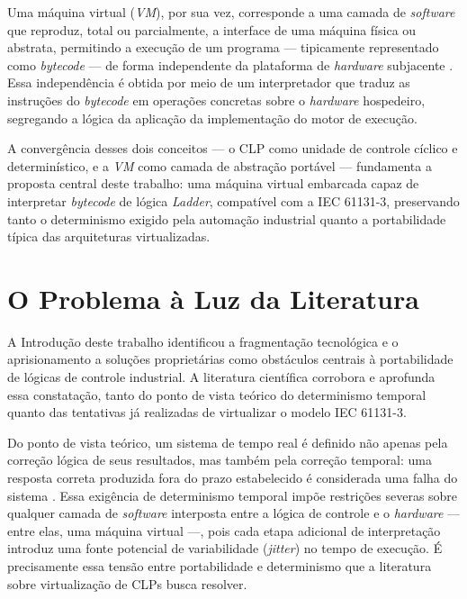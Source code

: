 Uma máquina virtual (\textit{VM}), por sua vez, corresponde a uma camada de \textit{software} que reproduz, total ou parcialmente, a interface de uma máquina física ou abstrata, permitindo a execução de um programa --- tipicamente representado como \textit{bytecode} --- de forma independente da plataforma de \textit{hardware} subjacente \cite{smith:2005}.
Essa independência é obtida por meio de um interpretador que traduz as instruções do \textit{bytecode} em operações concretas sobre o \textit{hardware} hospedeiro, segregando a lógica da aplicação da implementação do motor de execução.

A convergência desses dois conceitos --- o CLP como unidade de controle cíclico e determinístico, e a \textit{VM} como camada de abstração portável --- fundamenta a proposta central deste trabalho: uma máquina virtual embarcada capaz de interpretar \textit{bytecode} de lógica \textit{Ladder}, compatível com a IEC 61131-3, preservando tanto o determinismo exigido pela automação industrial quanto a portabilidade típica das arquiteturas virtualizadas.


\section{O Problema à Luz da Literatura}
\label{sec:problema-literatura}

A Introdução deste trabalho identificou a fragmentação tecnológica e o aprisionamento a soluções proprietárias como obstáculos centrais à portabilidade de lógicas de controle industrial.
A literatura científica corrobora e aprofunda essa constatação, tanto do ponto de vista teórico do determinismo temporal quanto das tentativas já realizadas de virtualizar o modelo IEC 61131-3.

Do ponto de vista teórico, um sistema de tempo real é definido não apenas pela correção lógica de seus resultados, mas também pela correção temporal: uma resposta correta produzida fora do prazo estabelecido é considerada uma falha do sistema \cite{liu:2000}.
Essa exigência de determinismo temporal impõe restrições severas sobre qualquer camada de \textit{software} interposta entre a lógica de controle e o \textit{hardware} --- entre elas, uma máquina virtual ---, pois cada etapa adicional de interpretação introduz uma fonte potencial de variabilidade (\textit{jitter}) no tempo de execução.
É precisamente essa tensão entre portabilidade e determinismo que a literatura sobre virtualização de CLPs busca resolver.

